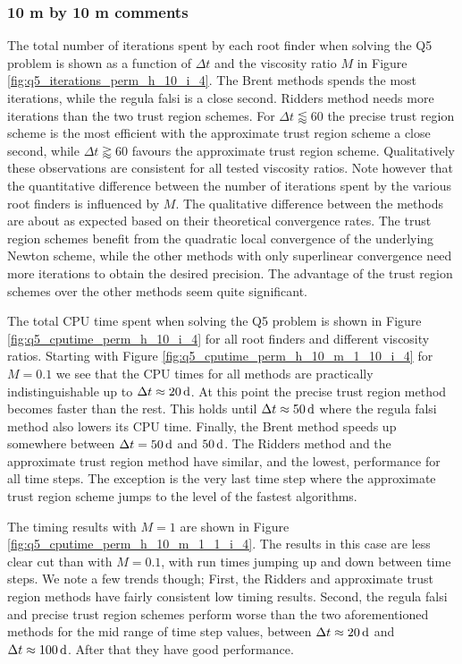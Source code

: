 \subsubsection{10 m by 10 m comments}
The total number of iterations spent by each root finder when solving the Q5 problem is shown as a function of $\Delta t$ and the viscosity ratio $M$ in Figure \ref{fig:q5_iterations_perm_h_10_i_4}. The Brent methods spends the most iterations, while the regula falsi is a close second. Ridders method needs more iterations than the two trust region schemes. For $\Delta t \lessapprox 60$ the precise trust region scheme is the most efficient with the approximate trust region scheme a close second, while $\Delta t \gtrapprox 60$ favours the approximate trust region scheme. Qualitatively these observations are consistent for all tested viscosity ratios. Note however that the quantitative difference between the number of iterations spent by the various root finders is influenced by $M$. The qualitative difference between the methods are about as expected based on their theoretical convergence rates. The trust region schemes benefit from the quadratic local convergence of the underlying Newton scheme, while the other methods with only superlinear convergence need more iterations to obtain the desired precision. The advantage of the trust region schemes over the other methods seem quite significant.



The total CPU time spent when solving the Q5 problem is shown in Figure \ref{fig:q5_cputime_perm_h_10_i_4} for all root finders and different viscosity ratios. Starting with Figure \ref{fig:q5_cputime_perm_h_10_m_1_10_i_4} for $M = 0.1$ we see that the CPU times for all methods are practically indistinguishable up to $\Delta t \approx \unit[20]{d}$. At this point the precise trust region method becomes faster than the rest. This holds until $\Delta t \approx \unit[50]{d}$ where the regula falsi method also lowers its CPU time. Finally, the Brent method speeds up somewhere between $\Delta t = \unit[50]{d}$ and $\unit[50]{d}$. The Ridders method and the approximate trust region method have similar, and the lowest, performance for all time steps. The exception is the very last time step where the approximate trust region scheme jumps to the level of the fastest algorithms.

The timing results with $M = 1$ are shown in Figure \ref{fig:q5_cputime_perm_h_10_m_1_1_i_4}. The results in this case are less clear cut than with $M = 0.1$, with run times jumping up and down between time steps. We note a few trends though; First, the Ridders and approximate trust region methods have fairly consistent low timing results. Second, the regula falsi and precise trust region schemes perform worse than the two aforementioned methods for the mid range of time step values, between $\Delta t \approx \unit[20]{d}$ and $\Delta t \approx \unit[100]{d}$. After that they have good performance.

